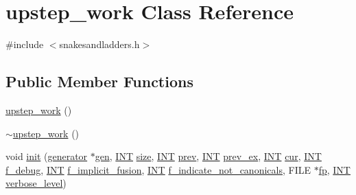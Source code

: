 \hypertarget{classupstep__work}{}\section{upstep\+\_\+work Class Reference}
\label{classupstep__work}


{\ttfamily \#include $<$snakesandladders.\+h$>$}

\subsection*{Public Member Functions}
\begin{DoxyCompactItemize}
\item 
\mbox{\hyperlink{classupstep__work_a02afd6dfbb34e4531d1fe9fffb8d9baf}{upstep\+\_\+work}} ()
\item 
\mbox{\hyperlink{classupstep__work_aba2dfa00bd13ddd170d7f51492d9072b}{$\sim$upstep\+\_\+work}} ()
\item 
void \mbox{\hyperlink{classupstep__work_a3b8bd802151efce3a5651712a1ef48ee}{init}} (\mbox{\hyperlink{classgenerator}{generator}} $\ast$\mbox{\hyperlink{classupstep__work_a07dc71a04cd45e96bc4e82bd0c268adf}{gen}}, \mbox{\hyperlink{galois_8h_a09fddde158a3a20bd2dcadb609de11dc}{I\+NT}} \mbox{\hyperlink{classupstep__work_af18b0e9289fb421db595ad553f274746}{size}}, \mbox{\hyperlink{galois_8h_a09fddde158a3a20bd2dcadb609de11dc}{I\+NT}} \mbox{\hyperlink{classupstep__work_a50aad3cf96f11237307499499d2b5015}{prev}}, \mbox{\hyperlink{galois_8h_a09fddde158a3a20bd2dcadb609de11dc}{I\+NT}} \mbox{\hyperlink{classupstep__work_ac7d8499bcc7c811b60d6226ddc97f91c}{prev\+\_\+ex}}, \mbox{\hyperlink{galois_8h_a09fddde158a3a20bd2dcadb609de11dc}{I\+NT}} \mbox{\hyperlink{classupstep__work_a0694546995210ad7623f9489c968ec29}{cur}}, \mbox{\hyperlink{galois_8h_a09fddde158a3a20bd2dcadb609de11dc}{I\+NT}} \mbox{\hyperlink{classupstep__work_a133f2e2d6ed5c93117b6a902bd317b0b}{f\+\_\+debug}}, \mbox{\hyperlink{galois_8h_a09fddde158a3a20bd2dcadb609de11dc}{I\+NT}} \mbox{\hyperlink{classupstep__work_a4c5dc44c133b720b1521f0c63c1e2859}{f\+\_\+implicit\+\_\+fusion}}, \mbox{\hyperlink{galois_8h_a09fddde158a3a20bd2dcadb609de11dc}{I\+NT}} \mbox{\hyperlink{classupstep__work_a15919737eb778195080e41cd7c321226}{f\+\_\+indicate\+\_\+not\+\_\+canonicals}}, F\+I\+LE $\ast$\mbox{\hyperlink{k__arc__lifting_8_c_a67cc9fbd0817c2d140368e5ed1f2a44d}{fp}}, \mbox{\hyperlink{galois_8h_a09fddde158a3a20bd2dcadb609de11dc}{I\+NT}} \mbox{\hyperlink{simeon_8_c_a818073fbcc2f439e7c56952f67386122}{verbose\+\_\+level}})

\end{DoxyCompactItemize}
